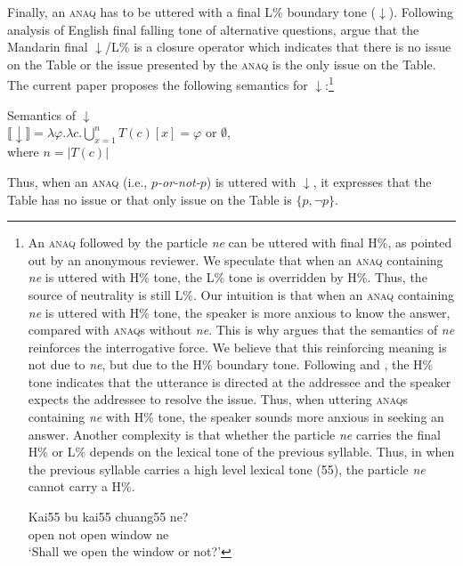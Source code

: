 \documentclass[output=paper,colorlinks,citecolor=brown]{langscibook}
\begin{document}
Finally,  an \textsc{anaq} has to be uttered with a final L\% boundary tone ($\downarrow$).  Following  analysis of English final falling tone of alternative questions, \citet{YuanHaraGlowinAsia2019} argue that the Mandarin final $\downarrow$/L\%  is a closure operator which indicates that there is no issue on the Table or the issue presented by the  \textsc{anaq}  is the only issue on the Table.  The current paper proposes the following semantics for $\downarrow$:\footnote{An \textsc{anaq} followed by the particle \textit{ne} can be uttered with final H\%, as pointed out by an anonymous reviewer.  We speculate that when  an \textsc{anaq} containing \textit{ne} is uttered with H\% tone, the L\% tone is overridden by H\%.  Thus, the source of neutrality is still L\%.    Our intuition is that when an \textsc{anaq} containing \textit{ne} is uttered with H\% tone, the speaker is more anxious to know the answer, compared with \textsc{anaq}s without \textit{ne}. This is why \citet{Shao} argues that the semantics of \textit{ne} reinforces the interrogative force. We believe that this reinforcing meaning is not due to  \textit{ne}, but due to the H\% boundary  tone. Following \citet{Bartels} and \citet{HD}, the H\% tone indicates that the utterance is directed at the addressee and  the speaker expects   the addressee to resolve the issue. Thus, when uttering \textsc{anaq}s containing \textit{ne} with H\% tone, the speaker sounds more anxious  in seeking an answer. Another complexity is that whether the particle \emph{ne} carries the final H\% or  L\% depends  on the lexical tone of the previous syllable.  Thus, in  when the previous syllable carries a high level lexical tone (55), the particle \emph{ne} cannot carry a H\%. 

\ea\label{chaung}\gll Kai55 bu kai55 chuang55 ne?\\
     open  not open  window   ne\\
    \glt `Shall we open the window or not?'
  \z  
    
}

\ea\label{dl} Semantics of $\downarrow$\\
$\llbracket\downarrow\rrbracket = \lambda \varphi. \lambda {c}. \bigcup_{x=1}^n{T}({c})[x]  = \varphi$ or $\emptyset$,\\
where $n=|T({c})|$
\z

Thus, when an \textsc{anaq} (i.e., $p$\emph{-or-not-}$p$) is uttered with $\downarrow$, it expresses that the Table has no issue or that only issue on the Table is $\{p, \neg p\}$.
\end{document}
